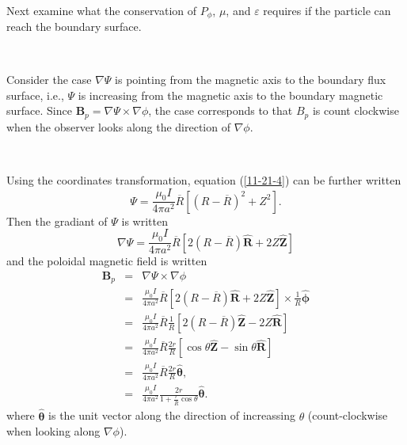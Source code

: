 \documentclass{article}
\begin{document}
\

Next examine what the conservation of $P_{\phi}$, $\mu$, and $\varepsilon$
requires if the particle can reach the boundary surface.

\

Consider the case $\nabla \Psi$ is pointing from the magnetic axis to the
boundary flux surface, i.e., $\Psi$ is increasing from the magnetic axis to
the boundary magnetic surface. Since $\mathbf{B}_p = \nabla \Psi \times \nabla
\phi$, the case corresponds to that $B_p$ is count clockwise when the observer
looks along the direction of $\nabla \phi$.

\

Using the coordinates transformation, equation (\ref{11-21-4}) can be further
written
\begin{equation}
  \Psi = \frac{\mu_0 I}{4 \pi a^2} \overline{R} [(R - \overline{R})^2 + Z^2] .
\end{equation}
Then the gradiant of $\Psi$ is written
\begin{equation}
  \nabla \Psi = \frac{\mu_0 I}{4 \pi a^2} \overline{R} [2 (R - \overline{R})
  \hat{\mathbf{R}} + 2 Z \hat{\mathbf{Z}}]
\end{equation}
and the poloidal magnetic field is written
\begin{eqnarray}
  \mathbf{B}_p & = & \nabla \Psi \times \nabla \phi \nonumber\\
  & = & \frac{\mu_0 I}{4 \pi a^2} \overline{R} [2 (R - \overline{R})
  \hat{\mathbf{R}} + 2 Z \hat{\mathbf{Z}}] \times \frac{1}{R}
  \hat{\mathbf{\phi}} \nonumber\\
  & = & \frac{\mu_0 I}{4 \pi a^2} \overline{R} \frac{1}{R} [2 (R -
  \overline{R}) \hat{\mathbf{Z}} - 2 Z \hat{\mathbf{R}}] \nonumber\\
  & = & \frac{\mu_0 I}{4 \pi a^2} \overline{R} \frac{2 r}{R} [\cos \theta
  \hat{\mathbf{Z}} - \sin \theta \hat{\mathbf{R}}] \nonumber\\
  & = & \frac{\mu_0 I}{4 \pi a^2} \overline{R} \frac{2 r}{R}
  \hat{\mathbf{\theta}}, \nonumber\\
  & = & \frac{\mu_0 I}{4 \pi a^2} \frac{2 r}{1 + \frac{r}{\overline{R}} \cos
  \theta} \hat{\mathbf{\theta}} . 
\end{eqnarray}
where $\hat{\mathbf{\theta}}$ is the unit vector along the direction of
increassing $\theta$ (count-clockwise when looking along $\nabla \phi$).

\

\

\
\end{document}
